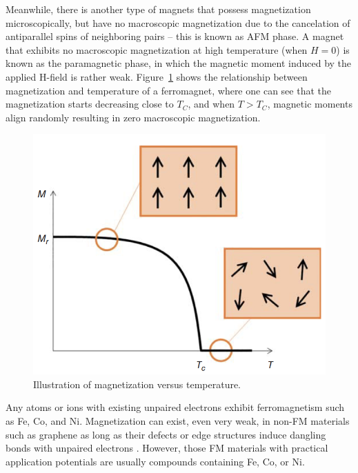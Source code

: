 Meanwhile, there is another type of magnets that possess magnetization
microscopically, but have no macroscopic magnetization due to the cancelation
of antiparallel spins of neighboring pairs – this is known as AFM phase.
A magnet that exhibits no macroscopic magnetization at high temperature (when $H = 0$) is known as the paramagnetic phase, in which the magnetic moment induced by the applied H-field is rather weak.
 Figure~\ref{fig:temp_mag} shows the relationship
between magnetization and temperature of a ferromagnet, where one can see
that the magnetization starts decreasing close to $T_C$, and when $T >T_C$, magnetic
moments align randomly resulting in zero macroscopic magnetization.
\begin{figure}[H]
	\centering
	\includegraphics{fig/review/temp_mag.png}
	\caption[Illustration of magnetization versus temperature.]{Illustration of magnetization versus temperature.}
\label{fig:temp_mag}
\end{figure}

Any atoms or ions with existing unpaired electrons exhibit ferromagnetism
such as Fe, Co, and Ni. Magnetization can exist, even very weak, in
non-FM materials such as graphene as long as their defects or edge
structures induce dangling bonds with unpaired electrons \cite{Ma:2012aa, Liu:2013aa}. However, those FM materials with practical application
potentials are usually compounds containing Fe, Co, or Ni.


